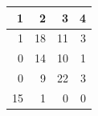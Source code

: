\begin{tabular}{rrrr}
\toprule
1 & 2 & 3 & 4 \\
\midrule
1 & 18 & 11 & 3 \\
0 & 14 & 10 & 1 \\
0 & 9 & 22 & 3 \\
15 & 1 & 0 & 0 \\
\bottomrule
\end{tabular}
